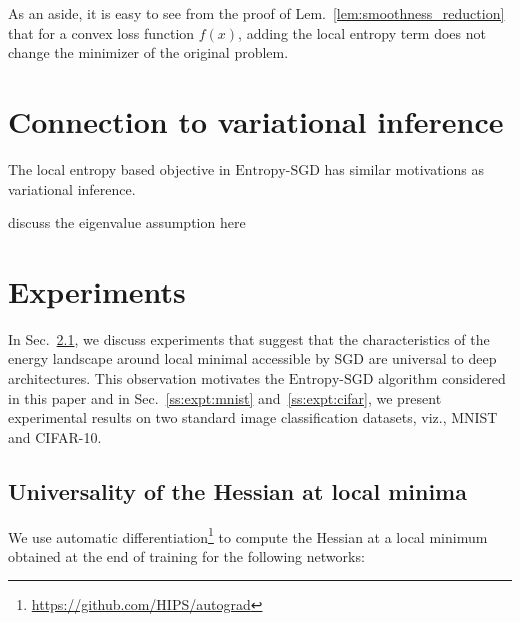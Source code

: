 \documentclass[10pt]{article}
\newcommand{\entropysgd}{\mathrm{Entropy}\textrm{-}\mathrm{SGD}}
\begin{document}
As an aside, it is easy to see from the proof of Lem.~\ref{lem:smoothness_reduction} that for a convex loss function $f(x)$, adding the local entropy term does not change the minimizer of the original problem.


\section{Connection to variational inference}
\label{s:app:connection_variational}
The local entropy based objective in $\entropysgd$ has similar motivations as variational inference.

\begin{remark}
discuss the eigenvalue assumption here
\end{remark}

\section{Experiments}
\label{s:expt}

In Sec.~\ref{ss:expt:universality}, we discuss experiments that suggest that the characteristics of the energy landscape around local minimal accessible by SGD are universal to deep architectures.  This observation motivates the $\entropysgd$ algorithm considered in this paper and in Sec.~\ref{ss:expt:mnist} and~\ref{ss:expt:cifar}, we present experimental results on two standard image classification datasets, viz., MNIST and CIFAR-10.

\subsection{Universality of the Hessian at local minima}
\label{ss:expt:universality}

We use automatic differentiation\footnote{\href{https://github.com/HIPS/autograd}{https://github.com/HIPS/autograd}} to compute the Hessian at a local minimum obtained at the end of training for the following networks:
\end{document}
